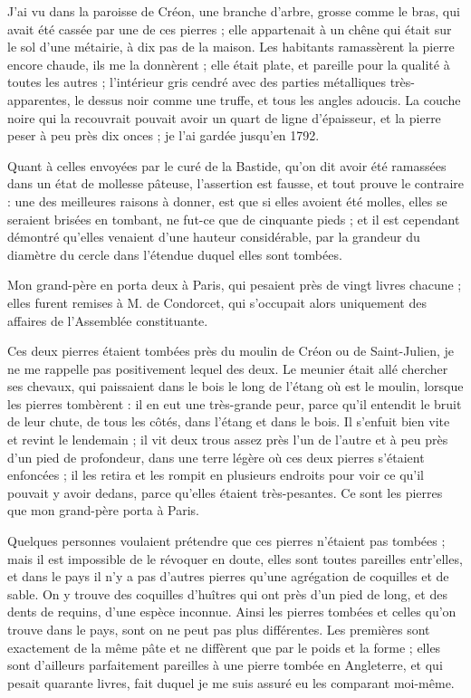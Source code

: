 \documentclass[a4paper, 12pt, oneside, french]{article}
\begin{document}
\og J'ai vu dans la paroisse de Créon, une branche d'arbre, grosse comme le bras, qui avait été cassée par une de ces pierres ; elle appartenait à un chêne qui était sur le sol d'une métairie, à dix pas de la maison. Les habitants ramassèrent la pierre encore chaude, ils me la donnèrent ; elle était plate, et pareille pour la qualité à toutes les autres ; l'intérieur gris cendré avec des parties métalliques très-apparentes, le dessus noir comme une truffe, et tous les angles adoucis. La couche noire qui la recouvrait pouvait avoir un quart de ligne d'épaisseur, et la pierre peser à peu près dix onces ; je l'ai gardée jusqu'en 1792. \fg

\og Quant à celles envoyées par le curé de la Bastide, qu'on dit avoir été ramassées dans un état de mollesse pâteuse, l'assertion est fausse, et tout prouve le contraire : une des meilleures raisons à donner, est que si elles avoient été molles, elles se seraient brisées en tombant, ne fut-ce que de cinquante pieds ; et il est cependant démontré qu'elles venaient d'une hauteur considérable, par la grandeur du diamètre du cercle dans l'étendue duquel elles sont tombées. \fg

\og Mon grand-père en porta deux à Paris, qui pesaient près de vingt livres chacune ; elles furent remises à M. de Condorcet, qui s'occupait alors uniquement des affaires de l'Assemblée constituante. \fg

\og Ces deux pierres étaient tombées près du moulin de Créon ou de Saint-Julien, je ne me rappelle pas positivement lequel des deux. Le meunier était allé chercher ses chevaux, qui paissaient dans le bois le long de l'étang où est le moulin, lorsque les pierres tombèrent : il en eut une très-grande peur, parce qu'il entendit le bruit de leur chute, de tous les côtés, dans l'étang et dans le bois. Il s'enfuit bien vite et revint le lendemain ; il vit deux trous assez près l'un de l'autre et à peu près d'un pied de profondeur, dans une terre légère où ces deux pierres s'étaient enfoncées ; il les retira et les rompit en plusieurs endroits pour voir ce qu'il pouvait y avoir dedans, parce qu'elles étaient très-pesantes. Ce sont les pierres que mon grand-père porta à Paris. \fg

\og Quelques personnes voulaient prétendre que ces pierres n'étaient pas tombées ; mais il est impossible de le révoquer en doute, elles sont toutes pareilles entr'elles, et dans le pays il n'y a pas d'autres pierres qu'une agrégation de coquilles et de sable. On y trouve des coquilles d'huîtres qui ont près d'un pied de long, et des dents de requins, d'une espèce inconnue. Ainsi les pierres tombées et celles qu'on trouve dans le pays, sont on ne peut pas plus différentes. Les premières sont exactement de la même pâte et ne diffèrent que par le poids et la forme ; elles sont d'ailleurs parfaitement pareilles à une pierre tombée en Angleterre, et qui pesait quarante livres, fait duquel je me suis assuré eu les comparant moi-même. \fg
\end{document}
